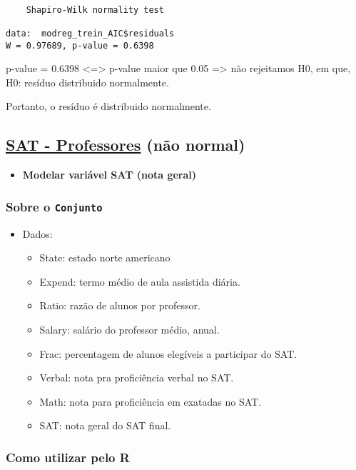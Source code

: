 \documentclass[11pt]{article}
\begin{document}
\begin{enumerate}
\begin{verbatim}

	Shapiro-Wilk normality test

data:  modreg_trein_AIC$residuals
W = 0.97689, p-value = 0.6398
\end{verbatim}


p-value = 0.6398 <=> p-value maior que 0.05 => não rejeitamos H0, em que, H0: resíduo distribuido normalmente.

Portanto, o resíduo é distribuido normalmente.
\end{enumerate}

\subsection{\href{https://r-data.pmagunia.com/dataset/r-dataset-package-mosaicdata-sat}{SAT - Professores} (não normal)}
\label{sec:org177f546}
\begin{itemize}
\item \textbf{Modelar variável SAT (nota geral)}
\end{itemize}
\subsubsection{Sobre o \texttt{Conjunto}}
\label{sec:org6ad4ecb}
\begin{itemize}
\item Dados:
\begin{itemize}
\item State: estado norte americano
\item Expend: termo médio de aula assistida diária.
\item Ratio: razão de alunos por professor.
\item Salary: salário do professor médio, anual.
\item Frac: percentagem de alunos elegíveis a participar do SAT.
\item Verbal: nota pra proficiência verbal no SAT.
\item Math: nota para proficiência em exatadas no SAT.
\item SAT: nota geral do SAT final.
\end{itemize}
\end{itemize}

\subsubsection{Como utilizar pelo R}
\label{sec:org7cf0ed7}
\end{document}
